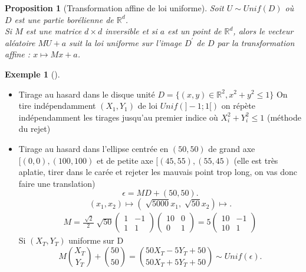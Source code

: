 \documentclass{article}
\theoremstyle{plain}%
\newtheorem{prop}[thm]{Proposition}
\theoremstyle{definition}
\newtheorem{exmp}{Exemple}[section]
\theoremstyle{remark}
\begin{document}
\begin{prop}[Transformation affine de loi uniforme]
	Soit $ U \sim Unif(D) $ où $ D $ est une partie borélienne de $ \mathbb{R}^d $.\\
	Si $ M $ est une matrice $ d \times d $ inversible et si $ a $ est un point de $ \mathbb{R}^d $, alors le vecteur aléatoire $ MU+a $ suit la loi uniforme sur l'image $ D^\prime  $ de $ D $ par la transformation affine : $ x \mapsto Mx+a $.
\end{prop}
\begin{exmp}[]
	\begin{itemize}
		\item Tirage au hasard dans le disque unité $ D = \{(x,y) \in \mathbb{R}^2, x^2+y^2 \leq 1\} $ On tire indépendamment $ (X_1, Y_1) $ de loi $ Unif(]-1;1[) $ on répète indépendamment les tirages jusqu'au premier indice où $ X_i^2 + Y_i^2 \leq 1 $ (méthode du rejet)
		\item Tirage au hasard dans l'ellipse centrée en $ (50,50) $ de grand axe $[(0,0) , (100,100)$ et de petite axe $ [(45,55),(55,45) $ (elle est très aplatie, tirer dans le carée et rejeter les mauvais point trop long, on vas donc faire une translation) 
		\[
			\epsilon = MD + (50,50)
		.\] 
		\[
			(x_1, x_2) \mapsto (\sqrt[]{5000}x_1, \sqrt[]{50}x_2) \mapsto 
		.\]
		\begin{align*}
			M = \frac{\sqrt[]{2}}{2}\sqrt[]{50} \begin{pmatrix}
				1 & -1 \\
				1 & 1
			\end{pmatrix}
			\begin{pmatrix}
				10 & 0 \\
				0 & 1
			\end{pmatrix} = 5 \begin{pmatrix}
				10 & -1 \\
				10 & 1
			\end{pmatrix}
		\end{align*}
		Si $ (X_T, Y_T) $ uniforme sur D 
		\[
			M \binom{X_T}{Y_T}  + \binom{50}{50} = \binom{50X_T - 5Y_T + 50}{50 X_T + 5Y_T + 50} \sim Unif(\epsilon )
		.\]
	\end{itemize}
\end{exmp}
\end{document}
